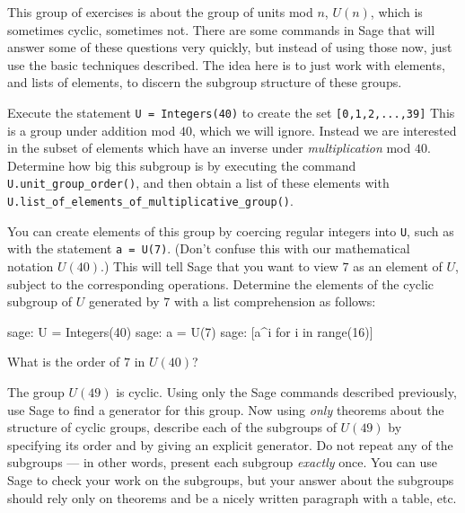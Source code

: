 This group of exercises is about the group of units mod $n$, $U(n)$, which is sometimes cyclic, sometimes not.  There are some commands in Sage that will answer some of these questions very quickly, but instead of using those now, just use the basic techniques described.  The idea here is to just work with elements, and lists of elements, to discern the subgroup structure of these groups.\par
\begin{sageverbatim}\end{sageverbatim}
%
%
Execute the statement \verb?U = Integers(40)? to create the set \verb?[0,1,2,...,39]?  This is a group under addition mod $40$, which we will ignore.  Instead we are interested in the subset of elements which have an inverse under \emph{multiplication} mod $40$.  Determine how big this subgroup is by executing the command \verb?U.unit_group_order()?, and then obtain a list of these elements with \verb?U.list_of_elements_of_multiplicative_group()?.\par
\begin{sageverbatim}\end{sageverbatim}
%
%
You can create elements of this group by coercing regular integers into \verb?U?, such as  with the statement \verb?a = U(7)?.  (Don't confuse this with our mathematical notation $U(40)$.)  This will tell Sage that you want to view $7$ as an element of $U$, subject to the corresponding operations.  Determine the elements of the cyclic subgroup of $U$ generated by $7$ with a list comprehension as follows:
%
\begin{sageverbatim}
sage: U = Integers(40)
sage: a = U(7)
sage: [a^i for i in range(16)]
\end{sageverbatim}
%
What is the order of $7$ in $U(40)$?\par
\begin{sageverbatim}\end{sageverbatim}
%
%
The group $U(49)$ is cyclic.  Using only the Sage commands described previously, use Sage to find a generator for this group.  Now using \emph{only} theorems about the structure of cyclic groups, describe each of the subgroups of $U(49)$ by specifying its order and by giving an explicit generator.  Do not repeat any of the subgroups --- in other words, present each subgroup \emph{exactly} once.  You can use Sage to check your work on the subgroups, but your answer about the subgroups should rely only on theorems and be a nicely written paragraph with a table, etc.\par
